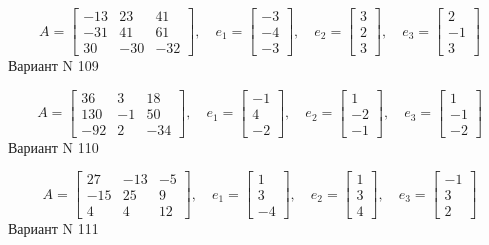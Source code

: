 \documentclass[11pt]{report}
\begin{document}
$$A = \left[\begin{matrix}-13 & 23 & 41\\-31 & 41 & 61\\30 & -30 & -32\end{matrix}\right],\quad e_1 = \left[\begin{matrix}-3\\-4\\-3\end{matrix}\right],\quad e_2 = \left[\begin{matrix}3\\2\\3\end{matrix}\right],\quad e_3 = \left[\begin{matrix}2\\-1\\3\end{matrix}\right]$$Вариант N 109

$$A = \left[\begin{matrix}36 & 3 & 18\\130 & -1 & 50\\-92 & 2 & -34\end{matrix}\right],\quad e_1 = \left[\begin{matrix}-1\\4\\-2\end{matrix}\right],\quad e_2 = \left[\begin{matrix}1\\-2\\-1\end{matrix}\right],\quad e_3 = \left[\begin{matrix}1\\-1\\-2\end{matrix}\right]$$Вариант N 110

$$A = \left[\begin{matrix}27 & -13 & -5\\-15 & 25 & 9\\4 & 4 & 12\end{matrix}\right],\quad e_1 = \left[\begin{matrix}1\\3\\-4\end{matrix}\right],\quad e_2 = \left[\begin{matrix}1\\3\\4\end{matrix}\right],\quad e_3 = \left[\begin{matrix}-1\\3\\2\end{matrix}\right]$$Вариант N 111
\end{document}
